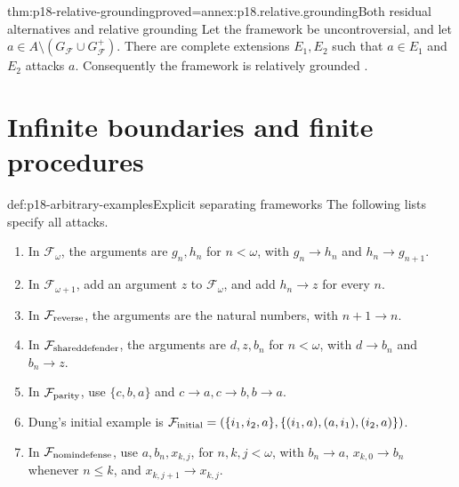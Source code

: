 \begin{hbtheorem}{thm:p18-relative-grounding}{proved=annex:p18.relative.grounding}{Both residual alternatives and relative grounding}
Let the framework be uncontroversial, and
let \(a\in A\setminus(G_{\mathcal F}\cup G_{\mathcal F}^+)\).
There are complete extensions \(E_1,E_2\)
such that \(a\in E_1\) and \(E_2\)
attacks \(a\). Consequently the framework
is relatively grounded
\cite[lemma~35 and theorem~33(2)]{Dung1995}.
\end{hbtheorem}

\section{Infinite boundaries and finite procedures}

\begin{hbdefinition}{def:p18-arbitrary-examples}{Explicit separating frameworks}
The following lists specify all attacks.
\begin{enumerate}
\item In \(\mathcal F_\omega\), the arguments are
      \(g_n,h_n\) for \(n<\omega\), with
      \(g_n\to h_n\) and \(h_n\to g_{n+1}\).
\item In \(\mathcal F_{\omega+1}\), add an argument
      \(z\) to \(\mathcal F_\omega\), and add
      \(h_n\to z\) for every \(n\).
\item In \(\mathcal F_{\rm reverse}\), the arguments
      are the natural numbers, with \(n+1\to n\).
\item In \(\mathcal F_{\rm shareddefender}\), the arguments
      are \(d,z,b_n\) for \(n<\omega\), with
      \(d\to b_n\) and \(b_n\to z\).
\item In \(\mathcal F_{\rm parity}\), use
      \(\{c,b,a\}\) and \(c\to a,c\to b,b\to a\).
\item Dung's initial example is
      \(\mathcal F_{\rm initial}=(\{i_1,i_2,a\},
      \{(i_1,a),(a,i_1),(i_2,a)\})\).
\item In \(\mathcal F_{\rm nomindefense}\), use
      \(a,b_n,x_{k,j}\), for \(n,k,j<\omega\),
      with \(b_n\to a\), \(x_{k,0}\to b_n\)
      whenever \(n\leq k\), and
      \(x_{k,j+1}\to x_{k,j}\).
\end{enumerate}
\end{hbdefinition}

